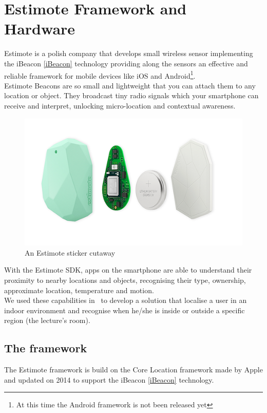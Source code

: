 \section{Estimote Framework and Hardware}
Estimote is a polish company that develops small wireless sensor implementing the iBeacon \ref{iBeacon} technology providing along the sensors an effective and reliable framework for mobile devices like iOS and Android\footnote{At this time the Android framework is not been released yet}.\\

Estimote Beacons are so small and lightweight that you can attach them to any location or object. They broadcast tiny radio signals which your smartphone can receive and interpret, unlocking micro-location and contextual awareness.\\

\begin{figure}[htbp]
\begin{center}
\includegraphics[width=\textwidth]{img/estimotebeacon.png}
\caption{An Estimote sticker cutaway}
\label{estimotesticker}
\end{center}
\end{figure}

With the Estimote SDK, apps on the smartphone are able to understand their proximity to nearby locations and objects, recognising their type, ownership, approximate location, temperature and motion.\\

We used these capabilities in \UB\ to develop a solution that localise a user in an indoor environment and recognise when he/she is inside or outside a specific region (the lecture's room).

\subsection{The framework}\label{estimoteframework}
The Estimote framework is build on the Core Location framework made by Apple and updated on 2014 to support the iBeacon \ref{iBeacon} technology.\\

